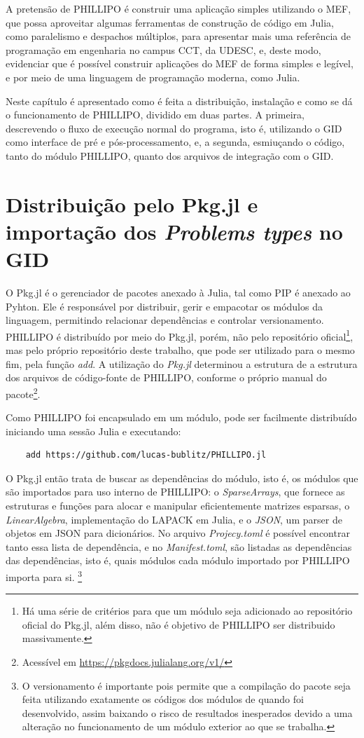 A pretensão de PHILLIPO é construir uma aplicação simples utilizando o MEF, que possa aproveitar algumas ferramentas de construção de código em Julia, como paralelismo e despachos múltiplos, para apresentar mais uma referência de programação em engenharia no campus CCT, da UDESC, e, deste modo, evidenciar que é possível construir aplicações do MEF de forma simples e legível, e por meio de uma linguagem de programação moderna, como Julia.

Neste capítulo é apresentado como é feita a distribuição, instalação e como se dá o funcionamento de PHILLIPO, dividido em duas partes. A primeira, descrevendo o fluxo de execução normal do programa, isto é, utilizando o GID como interface de pré e pós-processamento, e, a segunda, esmiuçando o código, tanto do módulo PHILLIPO, quanto dos arquivos de integração com o GID.

\section{Distribuição pelo Pkg.jl e importação dos \emph{Problems types} no GID}

O Pkg.jl é o gerenciador de pacotes anexado à Julia, tal como PIP é anexado ao Pyhton. Ele é responsável por distribuir, gerir e empacotar os módulos da linguagem, permitindo relacionar dependências e controlar versionamento. PHILLIPO é distribuído por meio do Pkg.jl, porém, não pelo repositório oficial\footnote{Há uma série de critérios para que um módulo seja adicionado ao repositório oficial do Pkg.jl, além disso, não é objetivo de PHILLIPO ser distribuido massivamente.}, mas pelo próprio repositório deste trabalho, que pode ser utilizado para o mesmo fim, pela função \emph{add}. A utilização do \emph{Pkg.jl} determinou a estrutura de a estrutura dos arquivos de código-fonte de PHILLIPO, conforme o próprio manual do pacote\footnote{Acessível em \url{https://pkgdocs.julialang.org/v1/}}.

Como PHILLIPO foi encapsulado em um módulo, pode ser facilmente distribuído iniciando uma sessão Julia e executando:
\begin{lstlisting}
    add https://github.com/lucas-bublitz/PHILLIPO.jl
\end{lstlisting}

O Pkg.jl então trata de buscar as dependências do módulo, isto é, os módulos que são importados para uso interno de PHILLIPO: o \emph{SparseArrays}, que fornece as estruturas e funções para alocar e manipular eficientemente matrizes esparsas, o \emph{LinearAlgebra}, implementação do LAPACK em Julia, e o \emph{JSON}, um parser de objetos em JSON para dicionários. No arquivo \emph{Projecy.toml} é possível encontrar tanto essa lista de dependência, e no \emph{Manifest.toml}, são listadas as dependências das dependências, isto é, quais módulos cada módulo importado por PHILLIPO importa para si. \footnote{O versionamento é importante pois permite que a compilação do pacote seja feita utilizando exatamente os códigos dos módulos de quando foi desenvolvido, assim baixando o risco de resultados inesperados devido a uma alteração no funcionamento de um módulo exterior ao que se trabalha. }


